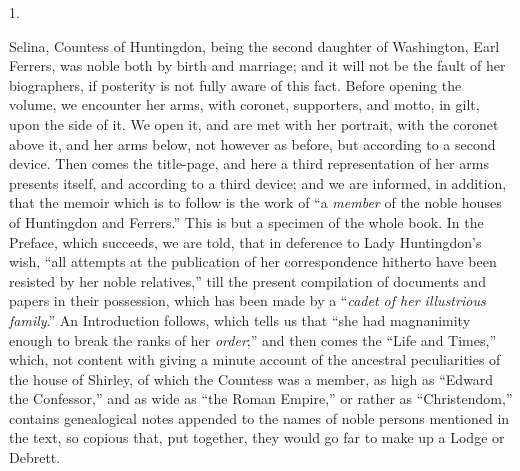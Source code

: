 1.

Selina, Countess of Huntingdon, being the second
daughter of Washington, Earl Ferrers, was noble both by birth and
marriage; and it will not be the fault of her biographers, if
posterity is not fully aware of this fact. Before opening the volume,
we encounter her arms, with coronet, supporters, and motto, in gilt,
upon the side of it. We open it, and are met with her portrait, with
the coronet above it, and her arms below, not however as before, but
according to a second device. Then comes the title-page, and here a
third representation of her arms presents itself, and according to a
third device; and we are informed, in addition, that the memoir which
is to follow is the work of ``a \emph{member} of the noble houses of
Huntingdon and Ferrers.'' This is but a specimen of the whole book. In
the Preface, which succeeds, we are told, that in deference to Lady
Huntingdon's wish, ``all attempts at the publication of her
correspondence hitherto have been resisted by her noble relatives,''
till the present compilation of documents and papers in their
possession, which has been made by a ``\emph{cadet of her illustrious
family}.'' An Introduction follows, which tells us that ``she
had magnanimity enough to break the ranks of her \emph{order};'' and
then comes the ``Life and Times,'' which, not content with giving a
minute account of the ancestral peculiarities of the house of Shirley,
of which the Countess was a member, as high as ``Edward the Confessor,''
and as wide as ``the Roman Empire,'' or rather as ``Christendom,''
contains genealogical notes appended to the names of noble persons
mentioned in the text, so copious that, put together, they would go
far to make up a Lodge or Debrett.

